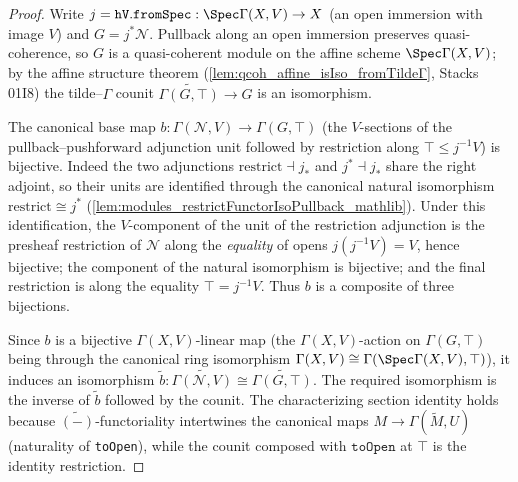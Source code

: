 \begin{proof}
  \leanok
  Write \(j = \mathtt{hV.fromSpec} : \Spec\Gamma(X,V) \to X\) (an open
  immersion with image \(V\)) and \(G = j^{*}\mathcal N\). Pullback along an
  open immersion preserves quasi-coherence, so \(G\) is a
  quasi-coherent module on the affine scheme \(\Spec\Gamma(X,V)\); by the
  affine structure theorem (\cref{lem:qcoh_affine_isIso_fromTildeΓ},
  Stacks 01I8) the tilde--\(\Gamma\)
  counit \(\widetilde{\Gamma(G,\top)} \to G\) is an isomorphism.

  The canonical base map \(b : \Gamma(\mathcal N, V) \to \Gamma(G, \top)\)
  (the \(V\)-sections of the pullback--pushforward adjunction unit followed by
  restriction along \(\top \le j^{-1}V\)) is bijective. Indeed the two
  adjunctions \(\mathrm{restrict} \dashv j_{*}\) and \(j^{*} \dashv j_{*}\)
  share the right adjoint, so their units are identified through the canonical
  natural isomorphism \(\mathrm{restrict} \cong j^{*}\)
  (\cref{lem:modules_restrictFunctorIsoPullback_mathlib}). Under this
  identification, the \(V\)-component of the unit of the restriction
  adjunction is the presheaf restriction of \(\mathcal N\) along the
  \emph{equality} of opens \(j(j^{-1}V) = V\), hence bijective; the component
  of the natural isomorphism is bijective; and the final restriction is along
  the equality \(\top = j^{-1}V\). Thus \(b\) is a composite of three
  bijections.

  Since \(b\) is a bijective \(\Gamma(X,V)\)-linear map (the
  \(\Gamma(X,V)\)-action on \(\Gamma(G,\top)\) being through the canonical
  ring isomorphism \(\Gamma(X,V) \cong \Gamma(\Spec\Gamma(X,V),\top)\)),
  it induces an isomorphism
  \(\widetilde{b} : \widetilde{\Gamma(\mathcal N,V)} \cong
  \widetilde{\Gamma(G,\top)}\). The required isomorphism is the inverse of
  \(\widetilde{b}\) followed by the counit. The characterizing section
  identity holds because \(\widetilde{(-)}\)-functoriality intertwines the
  canonical maps \(M \to \Gamma(\widetilde M, U)\) (naturality of
  \texttt{toOpen}), while the counit composed with \(\mathtt{toOpen}\) at
  \(\top\) is the identity restriction.
\end{proof}

